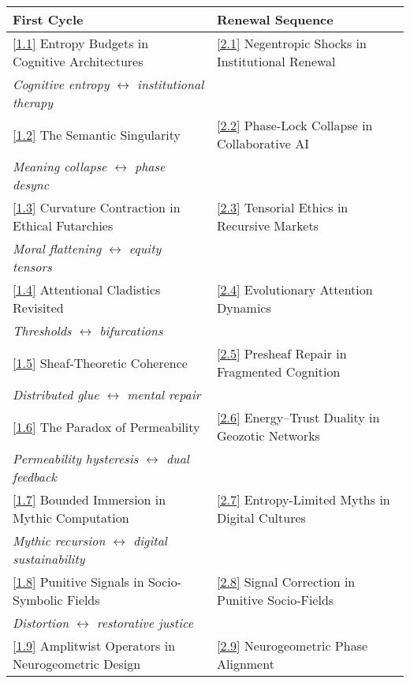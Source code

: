 \documentclass[12pt,a4paper]{article}
\newcommand{\essayref}[2]{\hyperref[sec:essay#1-#2]{[#1.#2]}}
\begin{document}
\begin{table}[ht]
\centering
\small
\begin{tabular}{@{}p{}p{}@{}}
\toprule
\textbf{First Cycle} & \textbf{Renewal Sequence} \\
\midrule
\essayref{1}{1} Entropy Budgets in Cognitive Architectures & \essayref{2}{1} Negentropic Shocks in Institutional Renewal \\
\emph{Cognitive entropy} $\leftrightarrow$ \emph{institutional therapy} & \\
\midrule
\essayref{1}{2} The Semantic Singularity & \essayref{2}{2} Phase-Lock Collapse in Collaborative AI \\
\emph{Meaning collapse} $\leftrightarrow$ \emph{phase desync} & \\
\midrule
\essayref{1}{3} Curvature Contraction in Ethical Futarchies & \essayref{2}{3} Tensorial Ethics in Recursive Markets \\
\emph{Moral flattening} $\leftrightarrow$ \emph{equity tensors} & \\
\midrule
\essayref{1}{4} Attentional Cladistics Revisited & \essayref{2}{4} Evolutionary Attention Dynamics \\
\emph{Thresholds} $\leftrightarrow$ \emph{bifurcations} & \\
\midrule
\essayref{1}{5} Sheaf-Theoretic Coherence & \essayref{2}{5} Presheaf Repair in Fragmented Cognition \\
\emph{Distributed glue} $\leftrightarrow$ \emph{mental repair} & \\
\midrule
\essayref{1}{6} The Paradox of Permeability & \essayref{2}{6} Energy--Trust Duality in Geozotic Networks \\
\emph{Permeability hysteresis} $\leftrightarrow$ \emph{dual feedback} & \\
\midrule
\essayref{1}{7} Bounded Immersion in Mythic Computation & \essayref{2}{7} Entropy-Limited Myths in Digital Cultures \\
\emph{Mythic recursion} $\leftrightarrow$ \emph{digital sustainability} & \\
\midrule
\essayref{1}{8} Punitive Signals in Socio-Symbolic Fields & \essayref{2}{8} Signal Correction in Punitive Socio-Fields \\
\emph{Distortion} $\leftrightarrow$ \emph{restorative justice} & \\
\midrule
\essayref{1}{9} Amplitwist Operators in Neurogeometric Design & \essayref{2}{9} Neurogeometric Phase Alignment \\

\end{tabular}
\end{table}
\end{document}
